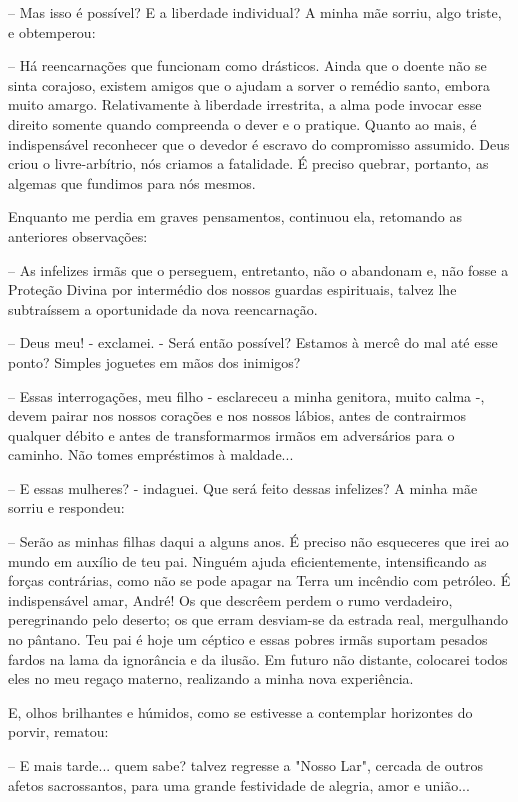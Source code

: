 \documentclass[portuguese,12pt,a4paper]{scrbook}
\begin{document}
	– Mas isso é possível? E a liberdade individual? A minha mãe sorriu, algo triste, e obtemperou:
	
	
	– Há reencarnações que funcionam como drásticos. Ainda que o doente não se sinta corajoso, existem amigos que o ajudam a sorver o remédio santo, embora muito amargo. Relativamente à liberdade irrestrita, a alma pode invocar esse direito somente quando compreenda o dever e o pratique. Quanto ao mais, é indispensável reconhecer que o devedor é escravo do compromisso assumido. Deus criou o livre-arbítrio, nós criamos a fatalidade. É preciso quebrar, portanto, as algemas que fundimos para nós mesmos.
	
	Enquanto me perdia em graves pensamentos, continuou ela, retomando as anteriores observações:
	
	– As infelizes irmãs que o perseguem, entretanto, não o abandonam e, não fosse a Proteção Divina por intermédio dos nossos guardas espirituais, talvez lhe subtraíssem a oportunidade da nova reencarnação.
	
	– Deus meu! - exclamei. - Será então possível? Estamos à mercê do mal até esse ponto? Simples joguetes em mãos dos inimigos?
	
	– Essas interrogações, meu filho - esclareceu a minha genitora, muito calma -, devem pairar nos nossos corações e nos nossos lábios, antes de contrairmos qualquer débito e antes de transformarmos irmãos em adversários para o caminho. Não tomes empréstimos à maldade...
	
	– E essas mulheres? - indaguei. Que será feito dessas infelizes? A minha mãe sorriu e respondeu:
	
	– Serão as minhas filhas daqui a alguns anos. É preciso não esqueceres que irei ao mundo em auxílio de teu pai. Ninguém ajuda eficientemente, intensificando as forças contrárias, como não se pode apagar na Terra um incêndio com petróleo. É indispensável amar, André! Os que descrêem perdem o rumo verdadeiro, peregrinando pelo deserto; os que erram desviam-se da estrada real, mergulhando no pântano. Teu pai é hoje um céptico e essas pobres irmãs suportam pesados fardos na lama da ignorância e da ilusão. Em futuro não distante, colocarei todos eles no meu regaço materno, realizando a minha nova experiência.
	
	E, olhos brilhantes e húmidos, como se estivesse a contemplar horizontes do porvir, rematou:
	
	– E mais tarde... quem sabe? talvez regresse a "Nosso Lar", cercada de outros afetos sacrossantos, para uma grande festividade de alegria, amor e união...
	
\end{document}
